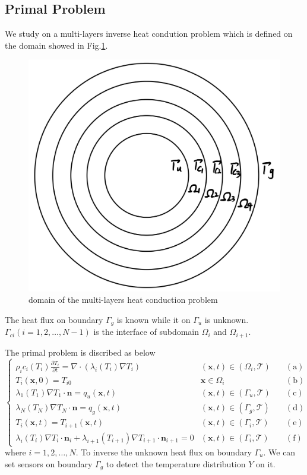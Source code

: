 \documentclass[UTF-8]{article}
\begin{document}
\subsection{Primal Problem}
We study on a multi-layers inverse heat condution problem which is defined on the domain showed in Fig.\ref{fig001}. 
\begin{figure}[ht]
	\centering
	\includegraphics[scale=0.2]{fig002.png}
	\caption{domain of the multi-layers heat conduction problem}
	\label{fig001}
\end{figure}
The heat flux on boundary $\Gamma_g$ is known while it on $\Gamma_u$ is unknown. $\Gamma_{ci}(i = 1,2,\dots,N-1)$ is the interface of subdomain $\Omega_i$ and $\Omega_{i+1}$.

The primal problem is discribed as below
\begin{equation}\label{equ021}
	\left\{
	\begin{array}{lll}
		\rho_i c_i(T_i) \frac{\partial T_i}{\partial t} = \nabla \cdot \left( \lambda_i(T_i) \nabla T_i \right) \quad &(\pmb{x},t) \in (\Omega_i,\mathcal{T}) \quad &(\text{a})\\
		T_i(\pmb{x},0) = T_{i0} &\pmb{x}\in \Omega_i &(\text{b})\\
		\lambda_1(T_1) \nabla T_1 \cdot \pmb{n} = q_u(\pmb{x},t) &(\pmb{x},t)\in (\Gamma_u,\mathcal{T}) &(\text{c})\\
		\lambda_N(T_N) \nabla T_N \cdot \pmb{n} = q_g(\pmb{x},t) &(\pmb{x},t)\in (\Gamma_g,\mathcal{T}) &(\text{d})\\
		T_i(\pmb{x},t) = T_{i+1}(\pmb{x},t) &(\pmb{x},t) \in (\Gamma_i,\mathcal{T}) & (\text{e})\\
		\lambda_i(T_i) \nabla T_i \cdot \pmb{n}_i + \lambda_{i+1}(T_{i+1}) \nabla T_{i+1} \cdot \pmb{n}_{i+1} = 0 & (\pmb{x},t) \in (\Gamma_i,\mathcal{T}) & (\text{f})
	\end{array}
	\right.
\end{equation}
where $i = 1,2,\dots,N$. To inverse the unknown heat flux on boundary $\Gamma_u$. We can set sensors on boundary $\Gamma_g$ to detect the temperature distribution $Y$ on it.
\end{document}
